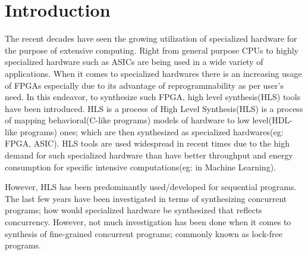 
\section{Introduction}

    The recent decades have seen the growing utilization of specialized hardware for the purpose of extensive computing. 
    Right from general purpose CPUs to highly specialized hardware such as ASICs are being used in a wide variety of applications.
    When it comes to specialized hardwares there is an increasing usage of FPGAs especially due to its advantage of reprogrammability as per user's need.
    In this endeavor, to synthesize such FPGA, high level synthesis(HLS) tools have been introduced.
    HLS is a process of High Level Synthesis(HLS) is a process of mapping behavioral(C-like programs) models of hardware to low level(HDL-like programs) ones; which are then synthesized as specialized hardwares(eg: FPGA, ASIC). 
    HLS tools are used widespread in recent times due to the high demand for such specialized hardware than have better throughput and energy consumption for specific intensive computations(eg: in Machine Learning).

    However, HLS has been predominantly used/developed for sequential programs. 
    The last few years have been investigated in terms of synthesizing concurrent programs; how would specialized hardware be synthesized that reflects concurrency.
    However, not much investigation has been done when it comes to synthesis of fine-grained concurrent programs; commonly known as lock-free programs.

